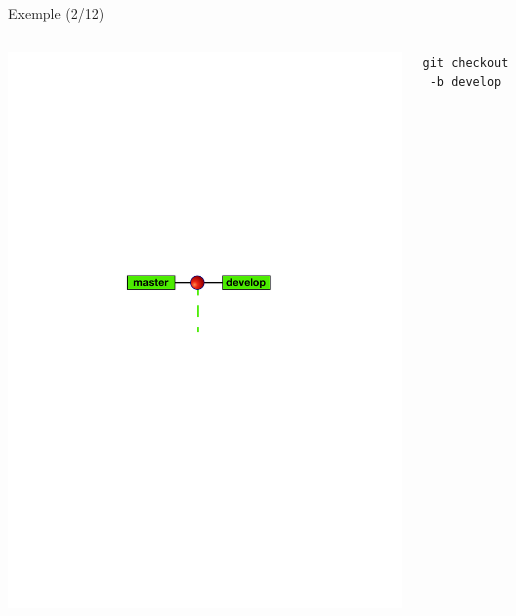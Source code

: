 \begin{frame}[fragile]{%
\protect\hypertarget{exemple-212}{%
Exemple (2/12)}}

\begin{columns}[T]
\begin{column}{0.40\textwidth}
\includegraphics[width=1\textwidth]{images/branch2.pdf}
\end{column}

\begin{column}{0.60\textwidth}
\texttt{git\ checkout\ -b\ develop}
\end{column}
\end{columns}

\end{frame}

